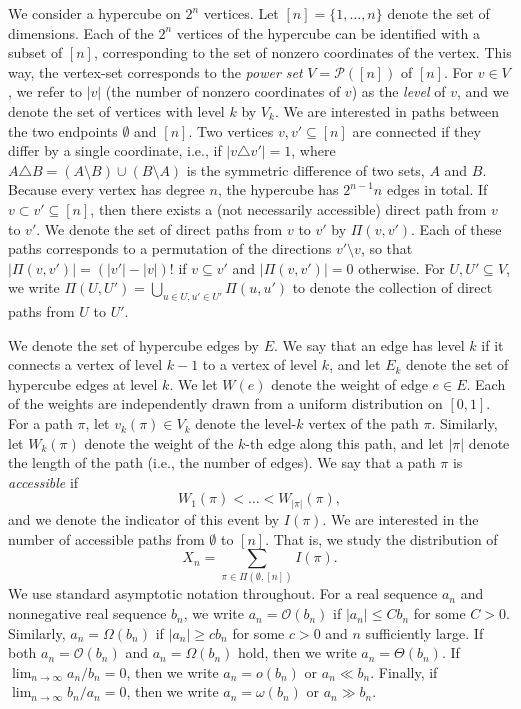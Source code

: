\documentclass[11pt]{article}
\theoremstyle{definition}
\theoremstyle{remark}
\theoremstyle{remark}
\numberwithin{theorem}{section}
\newcommand{\bigO}{\mathcal{O}}
\newcommand{\ds}{\displaystyle}
\begin{document}
We consider a hypercube on $2^n$ vertices. Let $[n]=\{1,\dots,n\}$ denote the set of dimensions. Each of the $2^n$ vertices of the hypercube can be identified with a subset of $[n]$, corresponding to the set of nonzero coordinates of the vertex. This way, the vertex-set corresponds to the \emph{power set} $V=\mathcal{P}([n])$ of $[n]$. For $v\in V$, we refer to $|v|$ (the number of nonzero coordinates of $v$) as the \emph{level} of $v$, and we denote the set of vertices with level $k$ by $V_k$. We are interested in paths between the two endpoints $\emptyset$ and $[n]$. Two vertices $v,v'\subseteq [n]$ are connected if they differ by a single coordinate, i.e., if $|v\triangle v'|=1$, where $A \triangle B = (A \setminus B) \cup (B \setminus A)$ is the symmetric difference of two sets, $A$ and $B$. Because every vertex has degree $n$, the hypercube has $2^{n-1}n$ edges in total. If $v\subset v'\subseteq[n]$, then there exists a (not necessarily accessible) direct path from $v$ to $v'$. We denote the set of direct paths from $v$ to $v'$ by $\Pi(v,v')$. Each of these paths corresponds to a permutation of the directions $v'\setminus v$, so that $|\Pi(v,v')|=(|v'|-|v|)!$ if $v\subseteq v'$ and $|\Pi(v,v')|=0$ otherwise. For $U,U'\subseteq V$, we write $\Pi(U,U')=\bigcup_{u\in U,u'\in U'}\Pi(u,u')$ to denote the collection of direct paths from $U$ to $U'$.

We denote the set of hypercube edges by $E$. We say that an edge has level $k$ if it connects a vertex of level $k-1$ to a vertex of level $k$, and let $E_k$ denote the set of hypercube edges at level $k$. We let $W(e)$ denote the weight of edge $e\in E$. Each of the weights are independently drawn from a uniform distribution on $[0,1]$. For a path $\pi$, let $v_k(\pi)\in V_k$ denote the level-$k$ vertex of the path $\pi$. Similarly, let $W_k(\pi)$ denote the weight of the $k$-th edge along this path, and let $|\pi|$ denote the length of the path (i.e., the number of edges). We say that a path $\pi$ is \emph{accessible} if
\[
W_1(\pi)<\dots<W_{|\pi|}(\pi),
\]
and we denote the indicator of this event by $I(\pi)$. We are interested in the number of accessible paths from $\emptyset$ to $[n]$. That is, we study the distribution of
\[
X_n=\sum_{\pi\in\Pi(\emptyset,[n])}I(\pi).
\]
We use standard asymptotic notation throughout. For a real sequence $a_{n}$ and nonnegative real sequence $b_{n}$, we write $a_{n} = \bigO(b_{n})$ if $|a_{n}| \leq Cb_{n}$ for some $C>0$. Similarly, $a_{n} = \Omega(b_{n})$ if $|a_{n}| \geq cb_{n}$ for some $c > 0$ and $n$ sufficiently large. If both $a_{n} = \bigO(b_{n})$ and $a_{n} = \Omega(b_{n})$ hold, then we write $a_{n} = \Theta(b_{n})$.  If $\ds\lim_{n \to \infty}a_{n}/b_{n} = 0$, then we write $a_{n} = o(b_{n})$ or $a_n \ll b_n$. Finally, if $\ds\lim_{n \to \infty}b_{n}/a_{n} = 0$, then we write $a_{n} = \omega(b_{n})$ or $a_n \gg b_n$.
\end{document}
